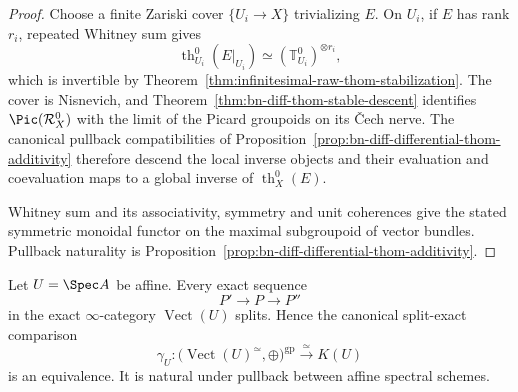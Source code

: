 \begin{proof}
Choose a finite Zariski cover \(\{U_i\to X\}\) trivializing \(E\).  On
\(U_i\), if \(E\) has rank \(r_i\), repeated Whitney sum gives
\[
  \operatorname{th}^0_{U_i}(E|_{U_i})
  \simeq
  (\mathbb T_{U_i}^0)^{\otimes r_i},
\]
which is invertible by
Theorem~\ref{thm:infinitesimal-raw-thom-stabilization}.  The cover is
Nisnevich, and Theorem~\ref{thm:bn-diff-thom-stable-descent} identifies
\(\Pic(\mathcal R_X^0)\) with the limit of the Picard groupoids on its
\v{C}ech nerve.  The canonical pullback compatibilities of
Proposition~\ref{prop:bn-diff-differential-thom-additivity} therefore descend
the local inverse objects and their evaluation and coevaluation maps to a
global inverse of \(\operatorname{th}^0_X(E)\).

Whitney sum and its associativity, symmetry and unit coherences give the stated
symmetric monoidal functor on the maximal subgroupoid of vector bundles.
Pullback naturality is
Proposition~\ref{prop:bn-diff-differential-thom-additivity}.
\end{proof}

\begin{lemma}
\label{lem:bn-diff-affine-vect-split}
Let \(U=\Spec A\) be affine.  Every exact sequence
\[
  P'\longrightarrow P\longrightarrow P''
\]
in the exact \(\infty\)-category \(\operatorname{Vect}(U)\) splits.  Hence the canonical split-exact comparison
\[
  \boxed{
  \gamma_U:
  \bigl(\operatorname{Vect}(U)^\simeq,\oplus\bigr)^{\mathrm{gp}}
  \xrightarrow{\simeq}
  K(U)
  }
\]
is an equivalence.  It is natural under pullback between affine spectral
schemes.
\end{lemma}

